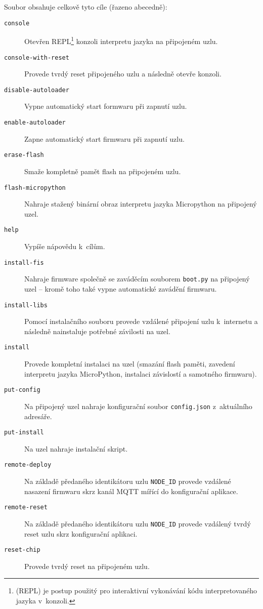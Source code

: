 Soubor  obsahuje celkově tyto cíle (řazeno abecedně):
\begin{description}
    \item[\texttt{console}] Otevřen REPL\footnote{ (REPL) je postup použitý pro
    interaktivní vykonávání kódu interpretovaného jazyka v~konzoli.} konzoli interpretu jazyka na připojeném uzlu.
    \item[\texttt{console-with-reset}] Provede tvrdý reset připojeného uzlu a následně otevře konzoli.
    \item[\texttt{disable-autoloader}] Vypne automatický start formwaru při zapnutí uzlu.
    \item[\texttt{enable-autoloader}] Zapne automatický start firmwaru při zapnutí uzlu.
    \item[\texttt{erase-flash}] Smaže kompletně pamět flash na připojeném uzlu.
    \item[\texttt{flash-micropython}] Nahraje stažený binární obraz interpretu jazyka Micropython na připojený uzel.
    \item[\texttt{help}] Vypíše nápovědu k~cílům.
    \item[\texttt{install-fis}] Nahraje firmware společně se zaváděcím souborem \texttt{boot.py} na připojený uzel --
    kromě toho také vypne automatické zavádění firmwaru.
    \item[\texttt{install-libs}] Pomocí instalačního souboru provede vzdálené připojení uzlu k~internetu a následně
    nainstaluje potřebné závilosti na uzel.
    \item[\texttt{install}] Provede kompletní instalaci na uzel (smazání flash paměti, zavedení interpretu jazyka
    MicroPython, instalaci závislostí a samotného firmwaru).
    \item[\texttt{put-config}] Na připojený uzel nahraje konfigurační soubor \texttt{config.json} z~aktuálního adresáře.
    \item[\texttt{put-install}] Na uzel nahraje instalační skript.
    \item[\texttt{remote-deploy}] Na základě předaného identikátoru uzlu \texttt{NODE\_ID} provede vzdálené nasazení
    firmwaru skrz kanál MQTT mířící do konfigurační aplikace.
    \item[\texttt{remote-reset}] Na základě předaného identikátoru uzlu \texttt{NODE\_ID} provede vzdálený tvrdý
    reset uzlu skrz konfigurační aplikaci.
    \item[\texttt{reset-chip}] Provede tvrdý reset na připojeném uzlu.
\end{description}
